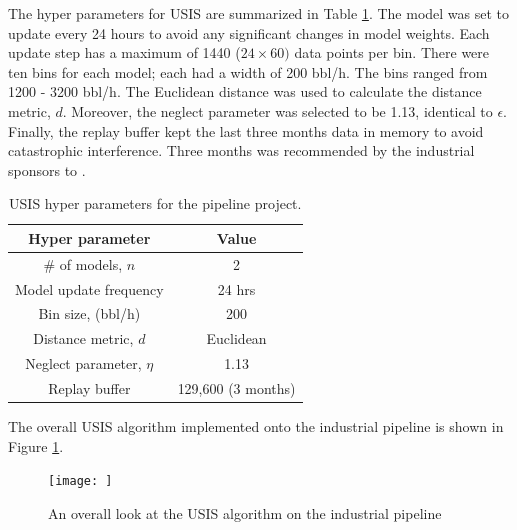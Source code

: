 The hyper parameters for USIS are summarized in Table \ref{tab:02USISHP}. The model was set to update every 24 hours to avoid any significant changes in model weights. Each update step has a maximum of 1440 ($24 \times 60)$ data points per bin. There were ten bins for each model; each had a width of 200 bbl/h.  The bins ranged from 1200 - 3200 bbl/h.  The Euclidean distance was used to calculate the distance metric, $d$.  Moreover, the neglect parameter was selected to be 1.13, identical to $\epsilon$.  Finally, the replay buffer kept the last three months data in memory to avoid catastrophic interference.  Three months was recommended by the industrial sponsors to .

\begin{table}[h]
    \centering
    \begin{tabular}{c|c}
    Hyper parameter & Value \\ \hline
    \# of models, $n$ & 2 \\
    Model update frequency & 24 hrs \\
    Bin size, (bbl/h) & 200 \\
    Distance metric, $d$ & Euclidean \\
    Neglect parameter, $\eta$ & 1.13 \\
    Replay buffer & 129,600 (3 months) \\
    \end{tabular}
    \caption{USIS hyper parameters for the pipeline project.}
    \label{tab:02USISHP}
\end{table}

The overall USIS algorithm implemented onto the industrial pipeline is shown in Figure \ref{fig:02USISPipe}.

\begin{figure}
    \centering
    \texttt{[image: ]}
    \caption{An overall look at the USIS algorithm on the industrial pipeline}
    \label{fig:02USISPipe}
\end{figure}
